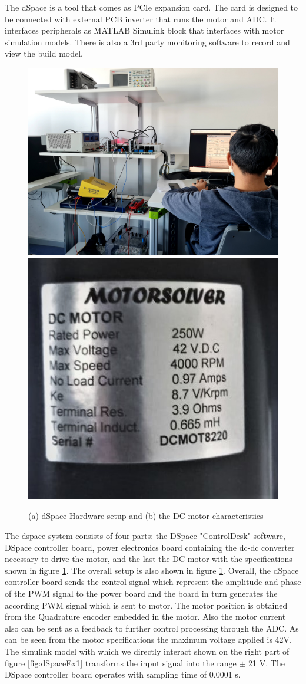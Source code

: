 \documentclass[]{final_report}
\begin{document}
The dSpace is a tool that comes as PCIe expansion card. The card is designed to be connected with external PCB inverter that runs the motor and ADC. It interfaces peripherals as MATLAB Simulink block that interfaces with motor simulation models. There is also a 3rd party monitoring software to record and view the build model. 
\begin{figure} [h!]
\centerline{\includegraphics[width=.52\textwidth]{Screenshots for paper/dSpace/dSpace Hardware.jpg}
\includegraphics[width=.41\textwidth]{Screenshots for paper/dSpace/motor_specs.jpg}}
\caption{(a) dSpace Hardware setup and (b) the DC motor characteristics}
\label{fig:dSpaceHardware setup}
\end{figure}

The dspace system consists of four parts: the DSpace "ControlDesk" software, DSpace controller board, power electronics board containing the dc-dc converter necessary to drive the motor, and the last the DC motor with the specifications shown in figure \ref{fig:dSpaceHardware setup}. The overall setup is also shown in figure \ref{fig:dSpaceHardware setup}. Overall, the dSpace controller board sends the control signal which represent the amplitude and phase of the PWM signal to the power board and the board in turn generates the according PWM signal which is sent to motor. The motor position is obtained from the Quadrature encoder embedded in the motor. Also the motor current also can be sent as a feedback to further control processing through the ADC. As can be seen from the motor specifications the maximum voltage applied is 42V. The simulink model with which we directly interact shown on the right part of figure \ref{fig:dSpaceEx1} transforms the input signal into the range $\pm$ 21 V. The DSpace controller board operates with sampling time of 0.0001 s.
\end{document}
